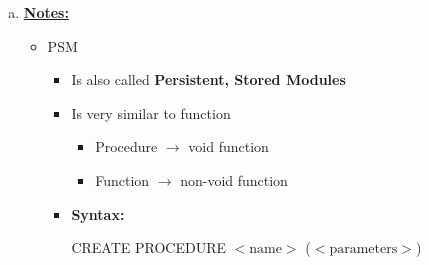 \documentclass[12pt]{article}
\begin{document}
\begin{enumerate}[1.]
\begin{enumerate}[a)]
\begin{lstlisting}[language=c]
                printf("Enter correct launched date (YYYY-MM-DD, Press enter to skip):\n");
                fgets(dateLaunched, sizeof(dateLaunched), stdin);

                if (dateLaunched[0] != '\n') {
                    // Correct date of launch
                    EXEC SQL UPDATE Ships
                             SET launched = newDateLaunched
                             WHERE name=:shipName AND
                                   class=:class AND
                                   launched=:dateLaunched;
                }

                printf("Enter correct battle date (YYYY-MM-DD, Press enter to skip):\n");
                fgets(dateBattle, sizeof(dateBattle),stdin);

                if (dateBattle[0] != '\n') {
                    // Correct date of battle
                    EXEC SQL UPDATE Battles
                             SET date = newDateBattle
                             WHERE name=:battle AND
                                   date=dateBattle;
                }
            }
        EXEC SQL CLOSE execCursor;

    }
    \end{lstlisting}

        \item

        \bigskip

        \underline{\textbf{Notes:}}

        \bigskip

        \begin{itemize}
            \item PSM
            \begin{itemize}
                \item Is also called \textbf{Persistent, Stored Modules}
                \item Is very similar to function
                \begin{itemize}
                    \item Procedure $\to$ void function
                    \item Function $\to$ non-void function
                \end{itemize}
                \item \textbf{Syntax:}

                \bigskip

                CREATE PROCEDURE $<\text{name}>$ ($<\text{parameters}>$)


\end{itemize}
\end{itemize}
\end{enumerate}
\end{enumerate}
\end{document}

